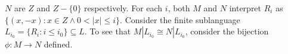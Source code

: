 \documentclass{article}\usepackage{amsmath}
\begin{document}
\noindent %
$N$ are $Z$ and $Z-\{0\}$ respectively. For each $i$, both $M$ and $N$ interpret $R_i$ as $\{(x,-x): x \in Z \land 0<|x|\leq i\}.$ Consider the finite sublanguage ${L_{i_0}=\{R_i:i\leq i_0\}\subseteq L}.$ To see that $M|L_{i_0}\cong N|L_{i_0}$, consider the bijection $\phi:M\rightarrow N$ defined.
\end{document}
